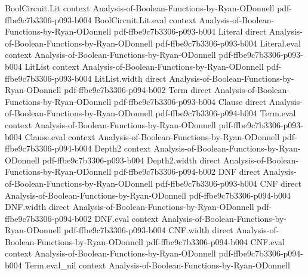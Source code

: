 \begin{lemma}
\label{BoolBLR.linear_bool_iff_character_aux_h_char}
\leanok
{}
\proofstep
  {BoolCircuit.Lit}
  {context}
  {Analysis-of-Boolean-Functions-by-Ryan-ODonnell}
  {pdf-ffbe9c7b3306-p093-b004}
\proofstep
  {BoolCircuit.Lit.eval}
  {context}
  {Analysis-of-Boolean-Functions-by-Ryan-ODonnell}
  {pdf-ffbe9c7b3306-p093-b004}
\proofstep
  {Literal}
  {direct}
  {Analysis-of-Boolean-Functions-by-Ryan-ODonnell}
  {pdf-ffbe9c7b3306-p093-b004}
\proofstep
  {Literal.eval}
  {context}
  {Analysis-of-Boolean-Functions-by-Ryan-ODonnell}
  {pdf-ffbe9c7b3306-p093-b004}
\proofstep
  {LitList}
  {context}
  {Analysis-of-Boolean-Functions-by-Ryan-ODonnell}
  {pdf-ffbe9c7b3306-p093-b004}
\proofstep
  {LitList.width}
  {direct}
  {Analysis-of-Boolean-Functions-by-Ryan-ODonnell}
  {pdf-ffbe9c7b3306-p094-b002}
\proofstep
  {Term}
  {direct}
  {Analysis-of-Boolean-Functions-by-Ryan-ODonnell}
  {pdf-ffbe9c7b3306-p093-b004}
\proofstep
  {Clause}
  {direct}
  {Analysis-of-Boolean-Functions-by-Ryan-ODonnell}
  {pdf-ffbe9c7b3306-p094-b004}
\proofstep
  {Term.eval}
  {context}
  {Analysis-of-Boolean-Functions-by-Ryan-ODonnell}
  {pdf-ffbe9c7b3306-p093-b004}
\proofstep
  {Clause.eval}
  {context}
  {Analysis-of-Boolean-Functions-by-Ryan-ODonnell}
  {pdf-ffbe9c7b3306-p094-b004}
\proofstep
  {Depth2}
  {context}
  {Analysis-of-Boolean-Functions-by-Ryan-ODonnell}
  {pdf-ffbe9c7b3306-p093-b004}
\proofstep
  {Depth2.width}
  {direct}
  {Analysis-of-Boolean-Functions-by-Ryan-ODonnell}
  {pdf-ffbe9c7b3306-p094-b002}
\proofstep
  {DNF}
  {direct}
  {Analysis-of-Boolean-Functions-by-Ryan-ODonnell}
  {pdf-ffbe9c7b3306-p093-b004}
\proofstep
  {CNF}
  {direct}
  {Analysis-of-Boolean-Functions-by-Ryan-ODonnell}
  {pdf-ffbe9c7b3306-p094-b004}
\proofstep
  {DNF.width}
  {direct}
  {Analysis-of-Boolean-Functions-by-Ryan-ODonnell}
  {pdf-ffbe9c7b3306-p094-b002}
\proofstep
  {DNF.eval}
  {context}
  {Analysis-of-Boolean-Functions-by-Ryan-ODonnell}
  {pdf-ffbe9c7b3306-p093-b004}
\proofstep
  {CNF.width}
  {direct}
  {Analysis-of-Boolean-Functions-by-Ryan-ODonnell}
  {pdf-ffbe9c7b3306-p094-b004}
\proofstep
  {CNF.eval}
  {context}
  {Analysis-of-Boolean-Functions-by-Ryan-ODonnell}
  {pdf-ffbe9c7b3306-p094-b004}
\proofstep
  {Term.eval_nil}
  {context}
  {Analysis-of-Boolean-Functions-by-Ryan-ODonnell}

\end{lemma}
